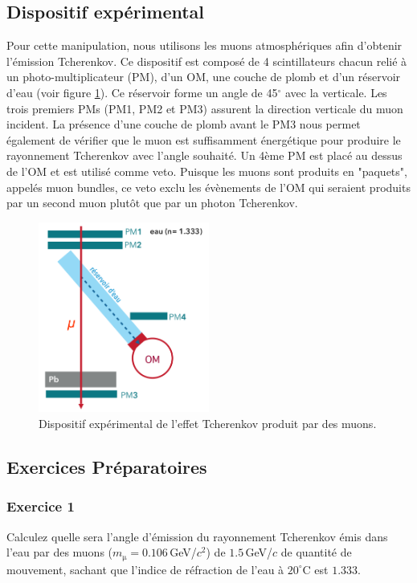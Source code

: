 \subsection{Dispositif expérimental}

Pour cette manipulation, nous utilisons les muons atmosphériques afin d'obtenir l'émission Tcherenkov. Ce dispositif est composé de 4 scintillateurs chacun relié à un photo-multiplicateur (PM), d'un OM, une couche de plomb et d'un réservoir d'eau (voir figure \ref{fig:dispo2}). Ce réservoir forme un angle de 45$^{\circ}$ avec la verticale. Les trois premiers PMs (PM1, PM2 et PM3) assurent la direction verticale du muon incident. La présence d'une couche de plomb avant le PM3 nous permet également de vérifier que le muon est suffisamment énergétique pour produire le rayonnement Tcherenkov avec l'angle souhaité. Un 4ème PM est placé au dessus de l'OM et est utilisé comme veto. Puisque les muons sont produits en "paquets", appelés muon bundles, ce veto exclu les évènements de l'OM qui seraient produits par un second muon plutôt que par un photon Tcherenkov.

\begin{figure}
    \centering
	\includegraphics[width=0.5\textwidth]{figures/Dispositif_2.png}
    \caption{Dispositif expérimental de l'effet Tcherenkov produit par des muons.}
    \label{fig:dispo2} 
\end{figure}

\subsection{Exercices Pr\'eparatoires}

\subsubsection{Exercice 1}
Calculez quelle sera l'angle d'\'emission du rayonnement Tcherenkov \'emis dans l’eau par des muons ($m_\mathrm{\mu} = 0.106$\,GeV/$c^2$) de $1.5$\,GeV/$c$ de quantité de mouvement, sachant que l'indice de r\'efraction de l'eau \`a $20^\circ$C est $1.333$.


